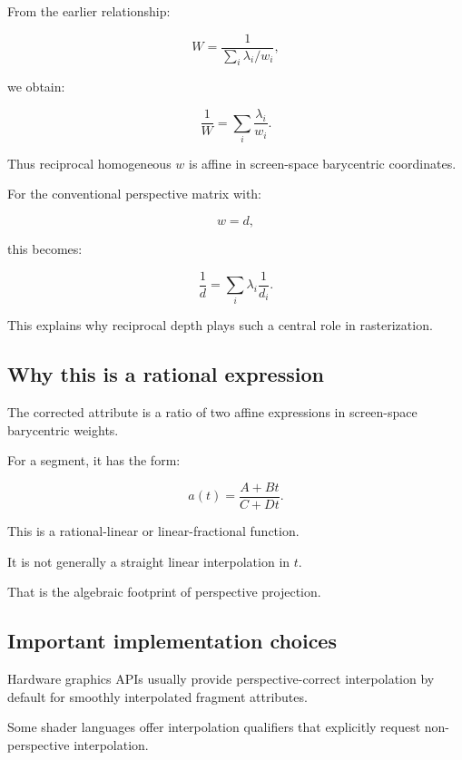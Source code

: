 \hypertarget{02-foundations-ii-ch034-derive-reciprocal-depth-interpolation}{}

From the earlier relationship:

\[
 W=\frac1{\sum_i\lambda_i/w_i},
\]

we obtain:

\[
 \boxed{ \frac1W= \sum_i\frac{\lambda_i}{w_i} }.
\]

Thus reciprocal homogeneous \(w\) is affine in screen-space barycentric coordinates.

For the conventional perspective matrix with:

\[
 w=d,
\]

this becomes:

\[
 \boxed{ \frac1d= \sum_i\lambda_i\frac1{d_i} }.
\]

This explains why reciprocal depth plays such a central role in rasterization.

\subsection{Why this is a rational expression}\label{02-foundations-ii-ch034-why-this-is-a-rational-expression}

\hypertarget{02-foundations-ii-ch034-why-this-is-a-rational-expression}{}

The corrected attribute is a ratio of two affine expressions in screen-space barycentric weights.

For a segment, it has the form:

\[
 a(t)= \frac{A+Bt}{C+Dt}.
\]

This is a rational-linear or linear-fractional function.

It is not generally a straight linear interpolation in \(t\).

That is the algebraic footprint of perspective projection.

\subsection{Important implementation choices}\label{02-foundations-ii-ch034-important-implementation-choices}

\hypertarget{02-foundations-ii-ch034-important-implementation-choices}{}

Hardware graphics APIs usually provide perspective-correct interpolation by default for smoothly interpolated fragment attributes.

Some shader languages offer interpolation qualifiers that explicitly request non-perspective interpolation.


